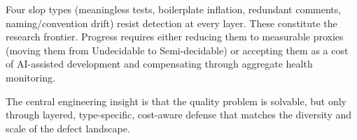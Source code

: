 \documentclass[11pt, a4paper, logo, copyright]{googledeepmind}
\begin{document}
Four slop types (meaningless tests, boilerplate inflation, redundant comments, naming/convention drift) resist detection at every layer. These constitute the research frontier. Progress requires either reducing them to measurable proxies (moving them from Undecidable to Semi-decidable) or accepting them as a cost of AI-assisted development and compensating through aggregate health monitoring.

The central engineering insight is that the quality problem is solvable, but only through layered, type-specific, cost-aware defense that matches the diversity and scale of the defect landscape.



\end{document}

